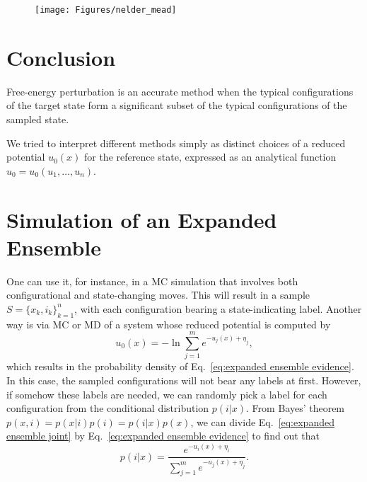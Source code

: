\documentclass[aip,jcp,reprint,amsmath,amssymb]{revtex4-1}
\begin{document}
\begin{figure}
\centering
\texttt{[image: Figures/nelder\_mead]}
\caption{}
\label{fig:nelder_mead}
\end{figure}


\section{Conclusion}

Free-energy perturbation is an accurate method when the typical configurations of the target state form a significant subset of the typical configurations of the sampled state.

We tried to interpret different methods simply as distinct choices of a reduced potential $u_0(x)$ for the reference state, expressed as an analytical function $u_0 = u_0(u_1,\dots,u_n)$.

\appendix

\section{Simulation of an Expanded Ensemble}
\label{sec:expanded ensemble simulation}

One can use it, for instance, in a MC simulation that involves both configurational and state-changing moves.\cite{Lyubartsev_1992} This will result in a sample $S = \{x_k,i_k\}_{k=1}^n$, with each configuration bearing a state-indicating label. Another way is via MC or MD of a system whose reduced potential is computed by
\begin{equation}
u_0(x) = - \ln \sum_{j=1}^m e^{-u_j(x) + \eta_j},
\end{equation}
which results in the probability density of Eq.~\eqref{eq:expanded ensemble evidence}. In this case, the sampled configurations will not bear any labels at first. However, if somehow these labels are needed, we can randomly pick a label for each configuration from the conditional distribution $p(i|x)$.\cite{Nymeyer_2010} From Bayes' theorem $p(x,i) = p(x|i) p(i) = p(i|x) p(x)$, we can divide Eq.~\eqref{eq:expanded ensemble joint} by Eq.~\eqref{eq:expanded ensemble evidence} to find out that
\begin{equation}
p(i|x) = \frac{e^{-u_i(x) + \eta_i}}{\sum_{j=1}^m e^{-u_j(x) + \eta_j}}.
\end{equation}
\end{document}
